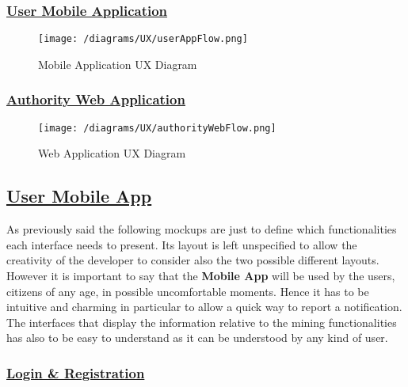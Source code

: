 		\newpage
		
		\subsubsection[User Mobile Application]{\hyperlink{toc}{User Mobile Application}}
			\label{sec:userUXDiagram}
		
			\begin{figure}[ht!]
				\centering
				\texttt{[image: /diagrams/UX/userAppFlow.png]}
				\caption{\label{fig:userAppFlow} Mobile Application UX Diagram}
			\end{figure}
		
			\FloatBarrier
		
		\subsubsection[Authority Web Application]{\hyperlink{toc}{Authority Web Application}}
			\label{sec:authorityUXDiagram}
			
			\begin{figure}[ht!]
				\centering
				\texttt{[image: /diagrams/UX/authorityWebFlow.png]}
				\caption{\label{fig:authorityAppFlow} Web Application UX Diagram}
			\end{figure}
		
			\FloatBarrier
			
	\subsection[User Mobile App]{\hyperlink{toc}{User Mobile App}}
		\label{sec:userMobileApp}
		
		As previously said the following mockups are just to define which functionalities each interface needs to present. Its layout is left unspecified to allow the creativity of the developer to consider also the two possible different layouts. However it is important to say that the \textbf{Mobile App} will be used by the users, citizens of any age, in possible uncomfortable moments. Hence it has to be intuitive and charming in particular to allow a quick way to report a notification. The interfaces that display the information relative to the mining functionalities has also to be easy to understand as it can be understood by any kind of user.
		
		\subsubsection[Login \& Registration]{\hyperlink{toc}{Login \& Registration}}
			\label{sec:userLoginRegistration}
			
